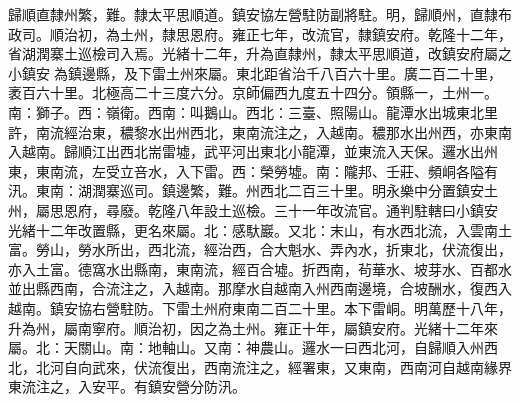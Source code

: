 \begin{pinyinscope}
歸順直隸州繁，難。隸太平思順道。鎮安協左營駐防副將駐。明，歸順州，直隸布政司。順治初，為土州，隸思恩府。雍正七年，改流官，隸鎮安府。乾隆十二年，省湖潤寨土巡檢司入焉。光緒十二年，升為直隸州，隸太平思順道，改鎮安府屬之小鎮安為鎮邊縣，及下雷土州來屬。東北距省治千八百六十里。廣二百二十里，袤百六十里。北極高二十三度六分。京師偏西九度五十四分。領縣一，土州一。南：獅子。西：嶺衛。西南：叫鵝山。西北：三臺、照陽山。龍潭水出城東北里許，南流經治東，穠黎水出州西北，東南流注之，入越南。穠那水出州西，亦東南入越南。歸順江出西北耑雷墟，武平河出東北小龍潭，並東流入天保。邏水出州東，東南流，左受立咅水，入下雷。西：榮勞墟。南：隴邦、壬莊、頻峒各隘有汛。東南：湖潤寨巡司。鎮邊繁，難。州西北二百三十里。明永樂中分置鎮安土州，屬思恩府，尋廢。乾隆八年設土巡檢。三十一年改流官。通判駐轄曰小鎮安，光緒十二年改置縣，更名來屬。北：感馱巖。又北：末山，有水西北流，入雲南土富。勞山，勞水所出，西北流，經治西，合大魁水、弄內水，折東北，伏流復出，亦入土富。德窩水出縣南，東南流，經百合墟。折西南，茍華水、坡芽水、百都水並出縣西南，合流注之，入越南。那摩水自越南入州西南邊境，合坡酬水，復西入越南。鎮安協右營駐防。下雷土州府東南二百二十里。本下雷峒。明萬歷十八年，升為州，屬南寧府。順治初，因之為土州。雍正十年，屬鎮安府。光緒十二年來屬。北：天關山。南：地軸山。又南：神農山。邏水一曰西北河，自歸順入州西北，北河自向武來，伏流復出，西南流注之，經署東，又東南，西南河自越南緣界東流注之，入安平。有鎮安營分防汛。


\end{pinyinscope}